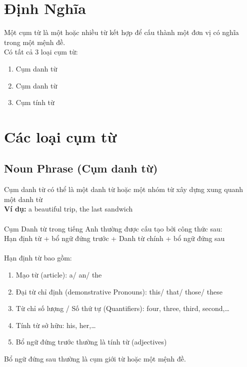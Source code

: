 
\chapter{Định Nghĩa}
Một cụm từ là một hoặc nhiều từ kết hợp để cấu thành một đơn vị có nghĩa trong một mệnh đề.\\
Có tất cả 3 loại cụm từ:
\begin{enumerate}
    \item Cụm danh từ
    \item Cụm danh từ
    \item Cụm tính từ
\end{enumerate}

\chapter{Các loại cụm từ}
\section{Noun Phrase (Cụm danh từ)}
Cụm danh từ có thể là một danh từ hoặc một nhóm từ xây dựng xung quanh một danh từ\\
\textbf{Ví dụ:} a beautiful trip, the last sandwich\\\\
Cụm Danh từ trong tiếng Anh thường được cấu tạo bởi công thức sau:\\
Hạn định từ + bổ ngữ đứng trước + Danh từ chính + bổ ngữ đứng sau\\\\
Hạn định từ bao gồm:
\begin{enumerate}
    \item Mạo từ (article): a/ an/ the
    \item Đại từ chỉ định (demonstrative Pronouns): this/ that/ those/ these
    \item Từ chỉ số lượng / Số thứ tự (Quantifiers): four, three, third, second,…
    \item Tính từ sở hữu: his, her,…
    \item Bổ ngữ đứng trước thường là tính từ (adjectives)
\end{enumerate}
Bổ ngữ đứng sau thường là cụm giới từ hoặc một mệnh đề.


